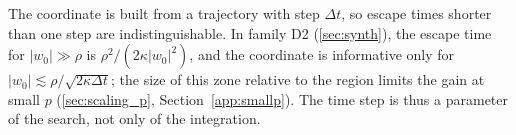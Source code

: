 The coordinate is built from a trajectory with step $\Delta t$, so escape times shorter than one step are indistinguishable. In family D2 (\cref{sec:synth}), the escape time for $|w_0|\gg\rho$ is $\rho^2/(2\kappa|w_0|^2)$, and the coordinate is informative only for $|w_0|\lesssim\rho/\sqrt{2\kappa\Delta t}$; the size of this zone relative to the region limits the gain at small $p$ (\cref{sec:scaling_p}, Section~\ref{app:smallp}). The time step is thus a parameter of the search, not only of the integration.
